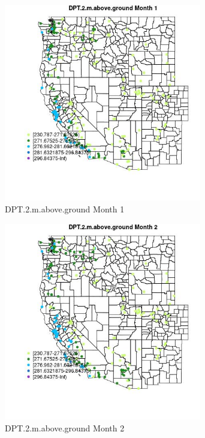 \begin{figure} 
\centering  
\includegraphics[width=0.77\textwidth]{Code_Outputs/Report_ML_input_PM25_Step4_part_e_de_duplicated_aveswNAs_MapObsMo1DPT2maboveground.jpg} 
\caption{\label{fig:Report_ML_input_PM25_Step4_part_e_de_duplicated_aveswNAsMapObsMo1DPT2maboveground}DPT.2.m.above.ground Month 1} 
\end{figure} 
 

\begin{figure} 
\centering  
\includegraphics[width=0.77\textwidth]{Code_Outputs/Report_ML_input_PM25_Step4_part_e_de_duplicated_aveswNAs_MapObsMo2DPT2maboveground.jpg} 
\caption{\label{fig:Report_ML_input_PM25_Step4_part_e_de_duplicated_aveswNAsMapObsMo2DPT2maboveground}DPT.2.m.above.ground Month 2} 
\end{figure} 
 

